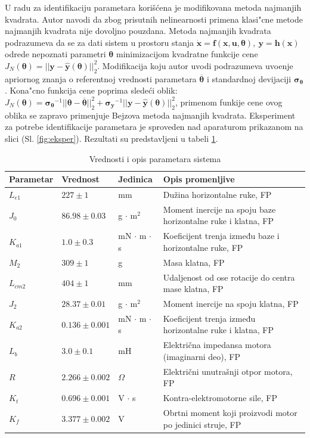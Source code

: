 \documentclass[a4paper,11pt]{article}
\theoremstyle{definition} \newtheorem{deff}{Definicija}[section]
\theoremstyle{definition} \newtheorem{prim}[deff]{Primer}
\theoremstyle{plain} \newtheorem{teor}[deff]{Teorema}
\newcommand{\vect}[1]{\boldsymbol{\mathbf{#1}}}
\begin{document}
	U radu \cite{inicijalna} za identifikaciju parametara korišćena je modifikovana metoda najmanjih kvadrata. Autor navodi da zbog prisutnih nelinearnosti primena klasi"cne metode najmanjih kvadrata nije dovoljno pouzdana. Metoda najmanjih kvadrata podrazumeva da se za dati sistem u prostoru stanja $\dot{\mathbf{x}} = \mathbf{f}(\mathbf{x}, \mathbf{u}, \vect{\theta}),~ \mathbf{y} = \mathbf{h}(\mathbf{x})$ odrede nepoznati parametri $\vect{\theta}$ minimizacijom kvadratne funkcije cene $J_N(\vect{\theta}) = ||\mathbf{y}-\hat{\mathbf{y}}(\vect{\theta})||^2_2$. Modifikacija koju autor uvodi podrazumeva uvo\dj enje apriornog znanja o referentnoj vrednosti parametara $\vect{\overline{\theta}}$ i standardnoj devijaciji $\vect{\sigma_{\vect{\theta}}}$. Kona"cno funkcija cene poprima slede\'ci oblik: $J_N(\vect{\theta}) = \vect{\sigma_{\vect{\theta}}}^{-1}||\vect{\theta}-\vect{\overline{\theta}}||^2_2 +  \vect{\sigma_{\vect{y}}}^{-1}||\mathbf{y}-\hat{\mathbf{y}}(\vect{\theta})||^2_2$, primenom funkije cene ovog oblika se zapravo primenjuje Bejzova metoda najmanjih kvadrata. Eksperiment za potrebe identifikacije parametara je sproveden nad aparaturom prikazanom na slici (Sl. \ref{fig:eksper}). Rezultati su predstavljeni u  tabeli \ref{tab:tab1}.
	
	\begin{table}[ht]
		\centering
		\caption{Vrednosti i opis parametara sistema}
		\begin{tabular}{l l l l}
			\toprule
			Parametar & Vrednost & Jedinica & Opis promenljive \\
			\midrule
			$L_{e1}$ & $227 \pm 1$ & mm & Dužina horizontalne ruke, FP \\
			$J_0$ & $86.98 \pm 0.03$ & g $\cdot$ m$^2$ & Moment inercije na spoju baze horizontalne ruke i klatna, FP \\
			$K_{a1}$ & $1.0 \pm 0.3$ & mN $\cdot$ m $\cdot$ s & Koeficijent trenja između baze i horizontalne ruke, FP \\
			$M_2$ & $309 \pm 1$ & g & Masa klatna, FP \\
			$L_{cm2}$ & $404 \pm 1$ & mm & Udaljenost od ose rotacije do centra mase klatna, FP \\
			$J_2$ & $28.37 \pm 0.01$ & g $\cdot$ m$^2$ & Moment inercije na spoju klatna, FP \\
			$K_{a2}$ & $0.136 \pm 0.001$ & mN $\cdot$ m $\cdot$ s & Koeficijent trenja između horizontalne ruke i klatna, FP \\
			$L_b$ & $3.0 \pm 0.1$ & mH & Električna impedansa motora (imaginarni deo), FP \\
			$R$ & $2.266 \pm 0.002$ & $\Omega$ & Električni unutrašnji otpor motora, FP \\
			$K_t$ & $0.696 \pm 0.001$ & V $\cdot$ s & Kontra-elektromotorne sile, FP \\
			$K_f$ & $3.377 \pm 0.002$ & V & Obrtni moment koji proizvodi motor po jedinici struje, FP \\
			\bottomrule
		\end{tabular}
		\label{tab:tab1}
	\end{table}
	
\end{document}
